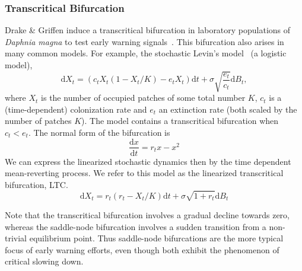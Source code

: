 \documentclass{pnastwo}
\newcommand{\ud}{\mathrm{d}}
\begin{document}
\begin{article}
\subsubsection{Transcritical Bifurcation}
Drake \& Griffen induce a transcritical bifurcation in laboratory populations of \emph{Daphnia magna} to test early warning signals~\cite{Drake2010}.  
This bifurcation also arises in many common models.  For example, the stochastic Levin's model~\cite{Levins1969} (a logistic model),
\begin{equation}
\ud X_t = \left( c_t X_t (1-X_t/K) - e_t X_t \right) \ud t + \sigma \sqrt{\frac{e_t}{c_t}} \ud B_t \label{levins},
\end{equation}
where $X_t$ is the number of occupied patches of some total number $K$, $c_t$ is a (time-dependent)
colonization rate and $e_t$ an extinction rate (both scaled by the number of patches $K$).  
The model contains a transcritical bifurcation when $c_t < e_t$.  The normal form of the bifurcation is
\begin{equation}
\frac{\ud x}{\ud t} = r_t x - x^2 
\label{transcritical}
\end{equation}
We can express the linearized stochastic dynamics then by the time dependent mean-reverting process. 
We refer to this model as the linearized transcritical bifurcation, LTC.  
\begin{equation}
\ud X_t = r_t (r_t - X_t/K) \ud t + \sigma \sqrt{1+r_t} \ud B_t \label{LTC}
\end{equation}

Note that the transcritical bifurcation involves a gradual decline towards zero,
whereas the saddle-node bifurcation involves a sudden transition from a non-trivial equilibrium point.
Thus saddle-node bifurcations are the more typical focus of early warning efforts, even though both exhibit the phenomenon of critical slowing down.


\end{article}
\end{document}
